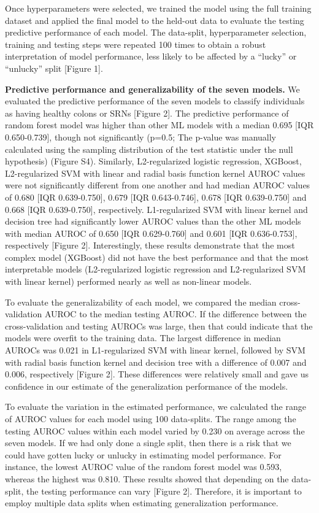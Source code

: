 \documentclass[11pt,]{article}
\begin{document}
Once hyperparameters were selected, we trained the model using the full
training dataset and applied the final model to the held-out data to
evaluate the testing predictive performance of each model. The
data-split, hyperparameter selection, training and testing steps were
repeated 100 times to obtain a robust interpretation of model
performance, less likely to be affected by a ``lucky'' or ``unlucky''
split {[}Figure 1{]}.

\textbf{Predictive performance and generalizability of the seven
models.} We evaluated the predictive performance of the seven models to
classify individuals as having healthy colons or SRNs {[}Figure 2{]}.
The predictive performance of random forest model was higher than other
ML models with a median 0.695 {[}IQR 0.650-0.739{]}, though not
significantly (p=0.5; The p-value was manually calculated using the
sampling distribution of the test statistic under the null hypothesis)
(Figure S4). Similarly, L2-regularized logistic regression, XGBoost,
L2-regularized SVM with linear and radial basis function kernel AUROC
values were not significantly different from one another and had median
AUROC values of 0.680 {[}IQR 0.639-0.750{]}, 0.679 {[}IQR
0.643-0.746{]}, 0.678 {[}IQR 0.639-0.750{]} and 0.668 {[}IQR
0.639-0.750{]}, respectively. L1-regularized SVM with linear kernel and
decision tree had significantly lower AUROC values than the other ML
models with median AUROC of 0.650 {[}IQR 0.629-0.760{]} and 0.601 {[}IQR
0.636-0.753{]}, respectively {[}Figure 2{]}. Interestingly, these
results demonstrate that the most complex model (XGBoost) did not have
the best performance and that the most interpretable models
(L2-regularized logistic regression and L2-regularized SVM with linear
kernel) performed nearly as well as non-linear models.

To evaluate the generalizability of each model, we compared the median
cross-validation AUROC to the median testing AUROC. If the difference
between the cross-validation and testing AUROCs was large, then that
could indicate that the models were overfit to the training data. The
largest difference in median AUROCs was 0.021 in L1-regularized SVM with
linear kernel, followed by SVM with radial basis function kernel and
decision tree with a difference of 0.007 and 0.006, respectively
{[}Figure 2{]}. These differences were relatively small and gave us
confidence in our estimate of the generalization performance of the
models.

To evaluate the variation in the estimated performance, we calculated
the range of AUROC values for each model using 100 data-splits. The
range among the testing AUROC values within each model varied by 0.230
on average across the seven models. If we had only done a single split,
then there is a risk that we could have gotten lucky or unlucky in
estimating model performance. For instance, the lowest AUROC value of
the random forest model was 0.593, whereas the highest was 0.810. These
results showed that depending on the data-split, the testing performance
can vary {[}Figure 2{]}. Therefore, it is important to employ multiple
data splits when estimating generalization performance.
\end{document}
